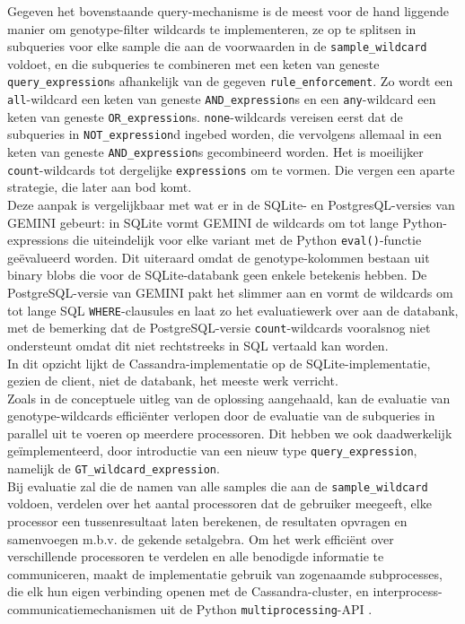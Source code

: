 Gegeven het bovenstaande query-mechanisme is de meest voor de hand liggende manier om genotype-filter wildcards te implementeren, ze op te splitsen in subqueries voor elke sample die aan de voorwaarden in de \texttt{sample\_wildcard} voldoet, en die subqueries te combineren met een keten van geneste \texttt{query\_expression}s afhankelijk van de gegeven \texttt{rule\_enforcement}. Zo wordt een \texttt{all}-wildcard een keten van geneste \texttt{AND\_expression}s en een \texttt{any}-wildcard een keten van geneste \texttt{OR\_expression}s. \texttt{none}-wildcards vereisen eerst dat de subqueries in \texttt{NOT\_expression}d ingebed worden, die vervolgens allemaal in een keten van geneste \texttt{AND\_expression}s gecombineerd worden. Het is moeilijker \texttt{count}-wildcards tot dergelijke \texttt{expressions} om te vormen. Die vergen een aparte strategie, die later aan bod komt.\\
Deze aanpak is vergelijkbaar met wat er in de SQLite- en PostgresQL-versies van GEMINI gebeurt: in SQLite vormt GEMINI de wildcards om tot lange Python-expressions die uiteindelijk voor elke variant met de Python \texttt{eval()}-functie ge\"evalueerd worden. Dit uiteraard omdat de genotype-kolommen bestaan uit binary blobs die voor de SQLite-databank geen enkele betekenis hebben. De PostgreSQL-versie van GEMINI pakt het slimmer aan en vormt de wildcards om tot lange SQL \texttt{WHERE}-clausules en laat zo het evaluatiewerk over aan de databank, met de bemerking dat de PostgreSQL-versie \texttt{count}-wildcards vooralsnog niet ondersteunt omdat dit niet rechtstreeks in SQL vertaald kan worden.\\
In dit opzicht lijkt de Cassandra-implementatie op de SQLite-implementatie, gezien de client, niet de databank, het meeste werk verricht.\\

Zoals in de conceptuele uitleg van de oplossing aangehaald, kan de evaluatie van genotype-wildcards effici\"enter verlopen door de evaluatie van de subqueries in parallel uit te voeren op meerdere processoren. Dit hebben we ook daadwerkelijk ge\"implementeerd, door introductie van een nieuw type \texttt{query\_expression}, namelijk de \texttt{GT\_wildcard\_expression}.\\
Bij evaluatie zal die de namen van alle samples die aan de \texttt{sample\_wildcard} voldoen, verdelen over het aantal processoren dat de gebruiker meegeeft, elke processor een tussenresultaat laten berekenen, de resultaten opvragen en samenvoegen m.b.v. de gekende setalgebra. Om het werk effici\"ent over verschillende processoren te verdelen en alle benodigde informatie te communiceren, maakt de implementatie gebruik van zogenaamde subprocesses, die elk hun eigen verbinding openen met de Cassandra-cluster, en interprocess-communicatiemechanismen uit de Python \texttt{multiprocessing}-API \cite{multiprocessing}.\\


